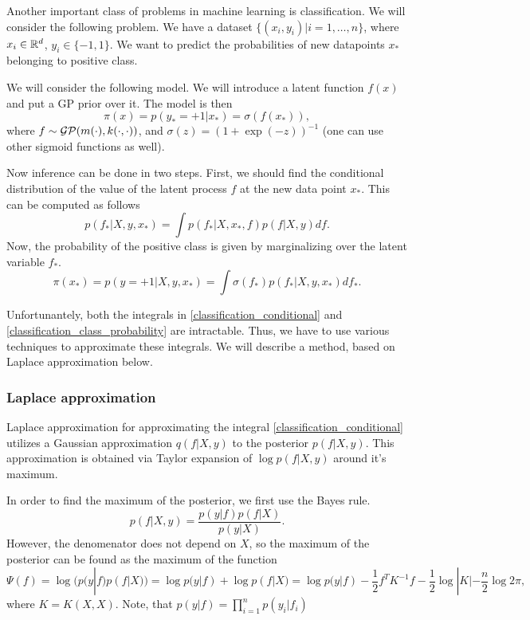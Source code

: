 \label{gp-classification}
	Another important class of problems in machine learning is classification. We will consider the following problem. We have a dataset $\{(x_i, y_i) | i = 1, \ldots, n\}$, where $x_i \in \mathbb{R}^d$, $y_i \in \{-1, 1\}$. We want to predict the probabilities of new datapoints $x_*$ belonging to positive class.

	We will consider the following model. We will introduce a latent function $f(x)$ and put a GP prior over it. The model is then
	$$\pi(x) = p(y_* = +1 | x_*) = \sigma(f(x_*)),$$
	where $f \sim \mathcal{GP}(m(\cdot), k(\cdot, \cdot))$, and $\sigma(z) = (1 + \exp(-z))^{-1}$ (one can use other sigmoid functions as well).

	Now inference can be done in two steps. First, we should find the conditional distribution of the value of the latent process $f$ at the new data point $x_*$. This can be computed as follows
	\begin{equation}
		\label{classification_conditional}
		p(f_* | X, y, x_*) = \int p(f_* | X, x_*, f) p(f | X, y) df.
	\end{equation}
	Now, the probability of the positive class is given by marginalizing over the latent variable $f_*$.
	\begin{equation}
		\label{classification_class_probability}
		\pi(x_*) = p(y = +1 | X, y, x_*) = \int \sigma(f_*) p(f_* | X, y, x_*) df_*.
	\end{equation}

	Unfortunantely, both the integrals in \ref{classification_conditional} and \ref{classification_class_probability} are intractable. Thus, we have to use various techniques to approximate these integrals. We will describe a method, based on Laplace approximation below.

	\subsubsection{Laplace approximation}
		Laplace approximation for approximating the integral \ref{classification_conditional} utilizes a Gaussian approximation $q(f| X, y)$ to the posterior $p(f | X, y)$. This approximation is obtained via Taylor expansion of $\log p(f| X, y)$ around it's maximum.

		In order to find the maximum of the posterior, we first use the Bayes rule.
		$$p(f | X, y) = \frac{p(y | f) p(f | X)}{p(y | X)}.$$
		However, the denomenator does not depend on $X$, so the maximum of the posterior can be found as the maximum of the function
		$$\Psi(f) = \log(p(y | f) p(f | X)) = \log p(y | f) + \log p(f | X) = \log p(y | f) - \frac 1 2 f^T K^{-1} f - \frac 1 2 \log |K| - \frac n 2 \log 2 \pi,$$
		where $K = K(X, X)$. Note, that $p(y | f) = \prod_{i = 1}^n p(y_i | f_i)$

